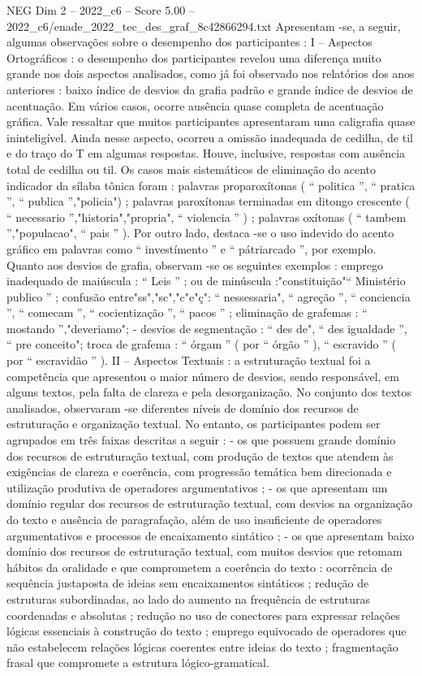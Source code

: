 \begin{textsample}{NEG Dim 2 – 2022\_c6 – Score 5.00 – 2022\_c6/enade\_2022\_tec\_des\_graf\_8c42866294.txt}
Apresentam -se, a seguir, algumas observações sobre o desempenho dos participantes : I – Aspectos Ortográficos : o desempenho dos participantes revelou uma diferença muito grande nos dois aspectos analisados, como já foi observado nos relatórios dos anos anteriores : baixo índice de desvios da grafia padrão e grande índice de desvios de acentuação.
Em vários casos, ocorre ausência quase completa de acentuação gráfica.
Vale ressaltar que muitos participantes apresentaram uma caligrafia quase ininteligível.
Ainda nesse aspecto, ocorreu a omissão inadequada de cedilha, de til e do traço do T em algumas respostas.
Houve, inclusive, respostas com ausência total de cedilha ou til.
Os casos mais sistemáticos de eliminação do acento indicador da sílaba tônica foram : palavras proparoxítonas ( “ politica ”, “ pratica ”, “ publica ”,"policia") ; palavras paroxítonas terminadas em ditongo crescente ( “ necessario ”,"historia","propria", “ violencia ” ) ; palavras oxítonas ( “ tambem ”,"populacao", “ pais ” ).
Por outro lado, destaca -se o uso indevido do acento gráfico em palavras como “ investímento ” e “ pátriarcado ”, por exemplo.
Quanto aos desvios de grafia, observam -se os seguintes exemplos : emprego inadequado de maiúscula : “ Leis ” ; ou de minúscula :"constituição"“ Ministério publico ” ; confusão entre"ss","sc","c"e"ç": “ nessessaria", “ agreção ”, “ conciencia ”, “ comecam ”, “ cocientização ”, “ pacos ” ; eliminação de grafemas : “ mostando ”,"deveriamo"; - desvios de segmentação : “ des de", “ des igualdade ”, “ pre conceito"; troca de grafema : “ órgam ” ( por “ órgão ” ), “ escravido ” ( por “ escravidão ” ).
II – Aspectos Textuais : a estruturação textual foi a competência que apresentou o maior número de desvios, sendo responsável, em alguns textos, pela falta de clareza e pela desorganização.
No conjunto dos textos analisados, observaram -se diferentes níveis de domínio dos recursos de estruturação e organização textual.
No entanto, os participantes podem ser agrupados em três faixas descritas a seguir : - os que possuem grande domínio dos recursos de estruturação textual, com produção de textos que atendem às exigências de clareza e coerência, com progressão temática bem direcionada e utilização produtiva de operadores argumentativos ; - os que apresentam um domínio regular dos recursos de estruturação textual, com desvios na organização do texto e ausência de paragrafação, além de uso insuficiente de operadores argumentativos e processos de encaixamento sintático ; - os que apresentam baixo domínio dos recursos de estruturação textual, com muitos desvios que retomam hábitos da oralidade e que comprometem a coerência do texto : ocorrência de sequência justaposta de ideias sem encaixamentos sintáticos ; redução de estruturas subordinadas, ao lado do aumento na frequência de estruturas coordenadas e absolutas ; redução no uso de conectores para expressar relações lógicas essenciais à construção do texto ; emprego equivocado de operadores que não estabelecem relações lógicas coerentes entre ideias do texto ; fragmentação frasal que compromete a estrutura lógico-gramatical.

\end{textsample}
